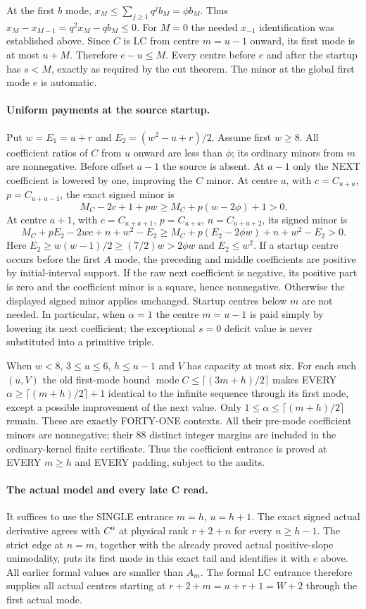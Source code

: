 At the first $b$ mode, $x_M\le\sum_{j\ge1}q^jb_M=\phi b_M$.
Thus $x_M-x_{M-1}=q^2x_M-qb_M\le0$. For $M=0$ the needed
$x_{-1}$ identification was established above. Since $C$ is LC from
centre $m=u-1$ onward, its first mode is at most $u+M$.
Therefore $e-u\le M$. Every centre before $e$ and after the startup
has $s<M$, exactly as required by the cut theorem. The minor at the
global first mode $e$ is automatic.

\paragraph{Uniform payments at the source startup.}
Put $w=E_1=u+r$ and $E_2=(w^2-u+r)/2$.
Assume first $w\ge8$. All coefficient ratios of $C$ from $u$ onward
are less than $\phi$; its ordinary minors from $m$ are nonnegative.
Before offset $a-1$ the source is absent. At $a-1$ only the NEXT
coefficient is lowered by one, improving the $C$ minor.
At centre $a$, with $c=C_{u+a}$, $p=C_{u+a-1}$,
the exact signed minor is
\[
             M_C-2c+1+pw\ge M_C+p(w-2\phi)+1>0.
\]
At centre $a+1$, with $c=C_{u+a+1}$, $p=C_{u+a}$,
$n=C_{u+a+2}$, its signed minor is
\[
 M_C+pE_2-2wc+n+w^2-E_2
       \ge M_C+p(E_2-2\phi w)+n+w^2-E_2>0.
\]
Here $E_2\ge w(w-1)/2\ge(7/2)w>2\phi w$ and $E_2\le w^2$.
If a startup centre occurs before the first $A$ mode, the preceding
and middle coefficients are positive by initial-interval support.
If the raw next coefficient is negative, its positive part is zero
and the coefficient minor is a square, hence nonnegative. Otherwise
the displayed signed minor applies unchanged.
Startup centres below $m$ are not needed. In particular, when
$\alpha=1$ the centre $m=u-1$ is paid simply by lowering its next
coefficient; the exceptional $s=0$ deficit value is never substituted
into a primitive triple.

When $w<8$, $3\le u\le6$, $h\le u-1$ and $V$ has capacity at most
six. For each such $(u,V)$ the old first-mode bound
$\operatorname{mode}C\le\lceil(3m+h)/2\rceil$ makes EVERY
$\alpha\ge\lceil(m+h)/2\rceil+1$ identical to the infinite sequence
through its first mode, except a possible improvement of the next
value. Only $1\le\alpha\le\lceil(m+h)/2\rceil$ remain. These are
exactly FORTY-ONE contexts. All their pre-mode coefficient minors
are nonnegative; their 88 distinct integer margins are included in
the ordinary-kernel finite certificate. Thus the coefficient entrance
is proved at EVERY $m\ge h$ and EVERY padding, subject to the audits.

\paragraph{The actual model and every late C read.}
It suffices to use the SINGLE entrance $m=h$, $u=h+1$.
The exact signed actual derivative agrees with $C^\alpha$ at physical
rank $r+2+n$ for every $n\ge h-1$. The strict edge at $n=m$, together
with the already proved actual positive-slope unimodality, puts its
first mode in this exact tail and identifies it with $e$ above.
All earlier formal values are smaller than $A_m$. The formal LC
entrance therefore supplies all actual centres starting at
$r+2+m=u+r+1=W+2$ through the first actual mode.

